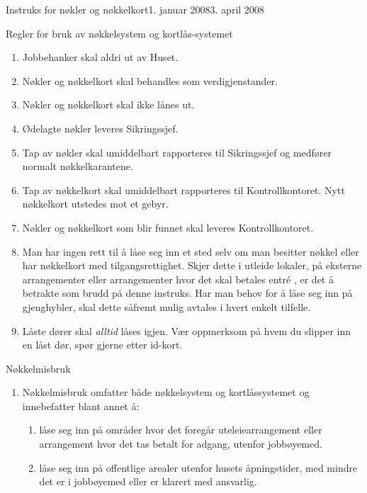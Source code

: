 \begin{instruks}{Instruks for nøkler og nøkkelkort}{1. januar 2008}{3. april 2008}
    \begin{instruksledd}{Regler for bruk av nøkkelsystem og kortlås-systemet}
        \begin{enumerate}
            \item Jobbehanker skal aldri ut av Huset.
            \item Nøkler og nøkkelkort skal behandles som verdigjenstander.
            \item Nøkler og nøkkelkort skal ikke lånes ut.
            \item Ødelagte nøkler leveres Sikringssjef.
            \item Tap av nøkler skal umiddelbart rapporteres til Sikringssjef og medfører normalt
                nøkkelkarantene.
            \item Tap av nøkkelkort skal umiddelbart rapporteres til Kontrollkontoret. Nytt
                nøkkelkort utstedes mot et gebyr.
            \item Nøkler og nøkkelkort som blir funnet skal leveres Kontrollkontoret.
            \item Man har ingen rett til å låse seg inn et sted selv om man besitter
                nøkkel eller har nøkkelkort med
                tilgangsrettighet. Skjer dette i utleide lokaler, på eksterne
                arrangementer eller arrangementer hvor det skal
                betales entr\'e , er det å betrakte som brudd på denne instruks. Har man
                behov for å låse seg inn på gjenghybler,
                skal dette såfremt mulig avtales i hvert enkelt tilfelle.
            \item Låste dører skal \emph{alltid} låses igjen. Vær oppmerksom på hvem du slipper inn
                en låst dør, spør gjerne etter id-kort.
        \end{enumerate}
    \end{instruksledd}

    \begin{instruksledd}{Nøkkelmisbruk}
        \begin{enumerate}
            \item Nøkkelmisbruk omfatter både nøkkelsystem og kortlåssystemet og
                innebefatter blant annet å:
                \begin{enumerate}
                    \item  låse seg inn på områder hvor det foregår uteleiearrangement
                        eller arrangement hvor det tas betalt for
                        adgang, utenfor jobbøyemed.
                    \item låse seg inn på offentlige arealer utenfor husets
                        åpningstider, med mindre det er i jobbøyemed eller er
                        klarert med ansvarlig.
                \end{enumerate}
        \end{enumerate}
    \end{instruksledd}


\end{instruks}
